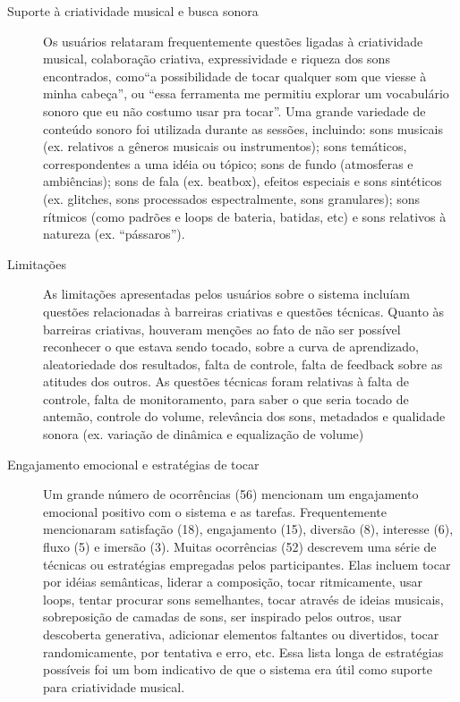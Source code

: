 \begin{description}
\item[Suporte à criatividade musical e busca sonora] Os usuários relataram frequentemente questões ligadas à criatividade musical, colaboração criativa, expressividade e riqueza dos sons encontrados, como``a possibilidade de tocar qualquer som que viesse à minha cabeça'', ou ``essa ferramenta me permitiu explorar um vocabulário sonoro que eu não costumo usar pra tocar''. Uma grande variedade de conteúdo sonoro foi utilizada durante as sessões, incluindo: sons musicais (ex. relativos a gêneros musicais ou instrumentos); sons temáticos, correspondentes a uma idéia ou tópico; sons de fundo (atmosferas e ambiências); sons de fala (ex. beatbox), efeitos especiais e sons sintéticos (ex. glitches, sons processados espectralmente, sons granulares); sons rítmicos (como padrões e loops de bateria, batidas, etc) e sons relativos à natureza (ex. ``pássaros'').

\item[Limitações] As limitações apresentadas pelos usuários sobre o sistema incluíam questões relacionadas à barreiras criativas e questões técnicas. Quanto às barreiras criativas, houveram menções ao fato de não ser possível reconhecer o que estava sendo tocado, sobre a curva de aprendizado, aleatoriedade dos resultados, falta de controle, falta de feedback sobre as atitudes dos outros. As questões técnicas foram relativas à falta de controle, falta de monitoramento, para saber o que seria tocado de antemão, controle do volume, relevância dos sons, metadados e qualidade sonora (ex. variação de dinâmica e equalização de volume)

\item[Engajamento emocional e estratégias de tocar] Um grande número de ocorrências (56) mencionam um engajamento emocional positivo com o sistema e as tarefas. Frequentemente mencionaram satisfação (18), engajamento (15), diversão (8), interesse (6), fluxo (5) e imersão (3). Muitas ocorrências (52) descrevem uma série de técnicas ou estratégias empregadas pelos participantes. Elas incluem tocar por idéias semânticas, liderar a composição, tocar ritmicamente, usar loops, tentar procurar sons semelhantes, tocar através de ideias musicais, sobreposição de camadas de sons, ser inspirado pelos outros, usar descoberta generativa, adicionar elementos faltantes ou divertidos, tocar randomicamente, por tentativa e erro, etc. Essa lista longa de estratégias possíveis foi um bom indicativo de que o sistema era útil como suporte para criatividade musical. 


\end{description}
